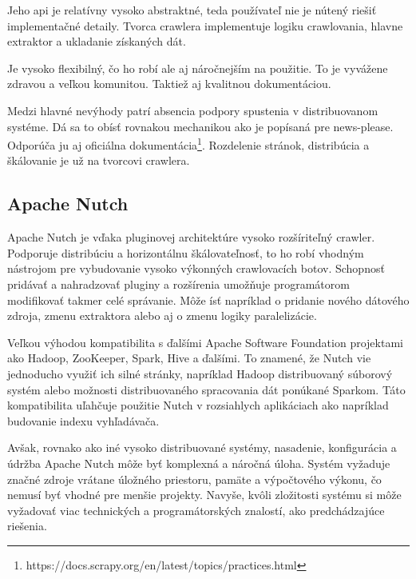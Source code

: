 Jeho \acrshort{api} je relatívny vysoko abstraktné, teda používateľ nie je nútený riešiť implementačné detaily. Tvorca crawlera implementuje logiku crawlovania, hlavne extraktor a ukladanie získaných dát.

Je vysoko flexibilný, čo ho robí ale aj náročnejším na použitie. To je vyvážene zdravou a veľkou komunitou. Taktiež aj kvalitnou dokumentáciou. 

Medzi hlavné nevýhody patrí absencia podpory spustenia v distribuovanom systéme. Dá sa to obísť rovnakou mechanikou ako je popísaná pre news-please. Odporúča ju aj oficiálna dokumentácia\footnote{https://docs.scrapy.org/en/latest/topics/practices.html}. Rozdelenie stránok, distribúcia a škálovanie je už na tvorcovi crawlera. 

\subsection{Apache Nutch}
Apache Nutch je vďaka pluginovej architektúre vysoko rozšíriteľný crawler. Podporuje distribúciu a horizontálnu škálovateľnosť, to ho robí vhodným nástrojom pre vybudovanie vysoko výkonných crawlovacích botov. Schopnosť pridávať a nahradzovať pluginy a rozšírenia umožňuje programátorom modifikovať takmer celé správanie. Môže ísť napríklad o pridanie nového dátového zdroja, zmenu extraktora alebo aj o zmenu logiky paralelizácie. 

Veľkou výhodou kompatibilita s ďalšími Apache Software Foundation projektami ako Hadoop, ZooKeeper, Spark, Hive a ďalšími. To znamené, že Nutch vie jednoducho využiť ich silné stránky, napríklad Hadoop distribuovaný súborový systém alebo možnosti distribuovaného spracovania dát ponúkané Sparkom. Táto kompatibilita uľahčuje použitie Nutch v rozsiahlych aplikáciach ako napríklad budovanie indexu vyhľadávača. 

Avšak, rovnako ako iné vysoko distribuované systémy, nasadenie, konfigurácia a údržba Apache Nutch môže byť komplexná a náročná úloha. Systém vyžaduje značné zdroje vrátane úložného priestoru, pamäte a výpočtového výkonu, čo nemusí byť vhodné pre menšie projekty. Navyše, kvôli zložitosti systému si môže vyžadovať viac technických a programátorských znalostí, ako predchádzajúce riešenia.
